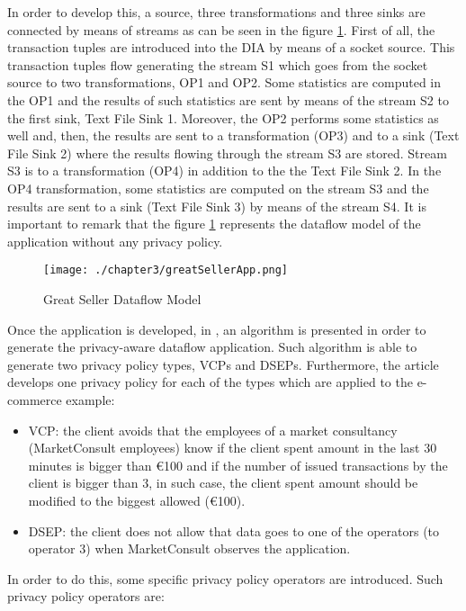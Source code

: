 In order to develop this, a source, three transformations and three sinks are connected by means of streams as can be seen in the figure \ref{fig:Great Seller Dataflow Model}. First of all, the transaction tuples are introduced into the DIA by means of a socket source. This transaction tuples flow generating the stream S1 which goes from the socket source to two transformations, OP1 and OP2. Some statistics are computed in the OP1 and the results of such statistics are sent by means of the stream S2 to the first sink, Text File Sink 1. Moreover, the OP2 performs some statistics as well and, then, the results are sent to a transformation (OP3) and to a sink (Text File Sink 2) where the results flowing through the stream S3 are stored. Stream S3 is to a transformation (OP4) in addition to the the Text File Sink 2. In the OP4 transformation, some statistics are computed on the stream S3 and the results are sent to a sink (Text File Sink 3) by means of the stream S4. It is important to remark that the figure \ref{fig:Great Seller Dataflow Model} represents the dataflow model of the application without any privacy policy.

\begin{figure}
\centering
{\texttt{[image: ./chapter3/greatSellerApp.png]}}
\caption{Great Seller Dataflow Model}
\label{fig:Great Seller Dataflow Model}
\end{figure}

Once the application is developed, in \cite{privacypoliciesarticle}, an algorithm is presented in order to generate the privacy-aware dataflow application. Such algorithm is able to generate two privacy policy types, VCPs and DSEPs. Furthermore, the article develops one privacy policy for each of the types which are applied to the e-commerce example:

\begin{itemize}
\item VCP: the client avoids that the employees of a market consultancy (MarketConsult employees) know if the client spent amount in the last 30 minutes is bigger than \euro{100} and if the number of issued transactions by the client is bigger than 3, in such case, the client spent amount should be modified to the biggest allowed (\euro{100}).
\item DSEP: the client does not allow that data goes to one of the operators (to operator 3) when MarketConsult observes the application.
\end{itemize}

In order to do this, some specific privacy policy operators are introduced. Such privacy policy operators are:

